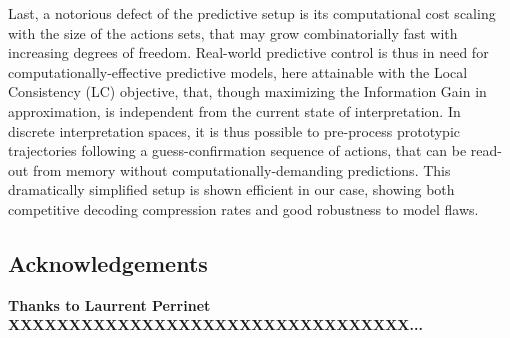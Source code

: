 \documentclass[12pt,twoside,openright]{article}
\begin{document}
Last, a notorious defect of the predictive setup is its computational cost scaling with the size of the actions sets, that may grow combinatorially fast with increasing degrees of freedom. Real-world predictive control is thus in need for computationally-effective predictive models, here attainable with the Local Consistency (LC) objective, that, though maximizing the Information Gain in approximation, is independent from the current state of interpretation. In discrete interpretation spaces, it is thus possible to pre-process prototypic trajectories following a guess-confirmation sequence of actions, that can be read-out from memory without computationally-demanding predictions. This dramatically simplified setup is shown efficient in our case, showing both competitive decoding compression rates and good robustness to model flaws. 

\subsection*{Acknowledgements}
{\color{magenta}\bf Thanks to Laurrent Perrinet XXXXXXXXXXXXXXXXXXXXXXXXXXXXXXXXX...}

\appendix
\end{document}
